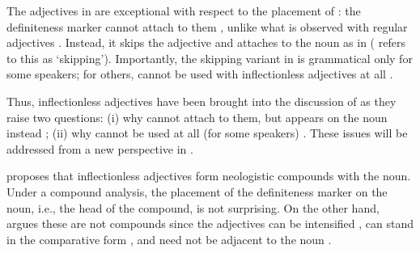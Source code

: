\documentclass[output=paper]{langscibook}
\begin{document}
\noindent The adjectives in  are exceptional with respect to the placement of \Def{}: the definiteness marker cannot attach to them , unlike what is observed with regular adjectives . Instead, it skips the adjective and attaches to the noun as in  (\citealt{Adamson2019PhD} refers to this as `skipping'). Importantly, the skipping variant in  is grammatical only for some speakers; for others, \Def{} cannot be used with inflectionless adjectives at all \citep[see][]{SpencerLuis2012}. 

\ea\judgewidth{\%}
\z 
\z 

\noindent Thus, inflectionless adjectives have been brought into the discussion of \Def{} as they raise two questions: (i) why \Def{} cannot attach to them, but appears on the noun instead \citep{Adamson2019PhD,Adamson2020}; (ii) why \Def{} cannot be used at all (for some speakers) \citep[see][]{Halpern1995}. These issues will be addressed from a new perspective in .

\citet[165, fn.~22]{Halpern1995} proposes that inflectionless adjectives form neo\-lo\-gistic compounds with the noun. Under a compound analysis, the placement of the definiteness marker on the noun, i.e., the head of the compound, is not surprising. On the other hand, \citet{Adamson2019PhD} argues these are not compounds since the adjectives can be intensified , can stand in the comparative form , and need not be adjacent to the noun .%
	
\z 
\end{document}

